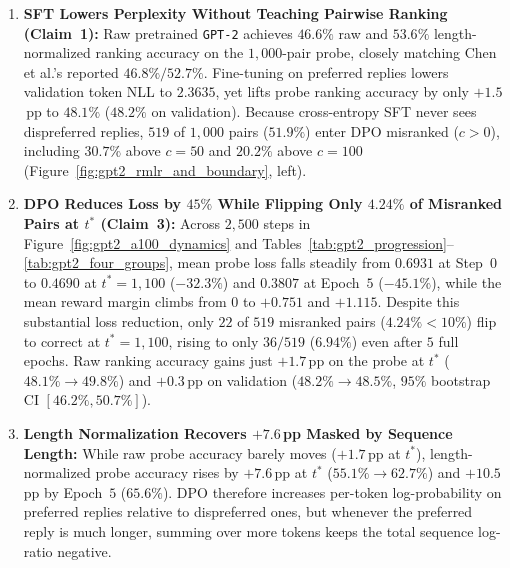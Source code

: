 \documentclass[11pt]{article}
\theoremstyle{plain}
\theoremstyle{definition}
\begin{document}
\begin{enumerate}[leftmargin=1.8em,itemsep=2.5pt,topsep=2pt]
  \item \textbf{SFT Lowers Perplexity Without Teaching Pairwise Ranking (Claim~1):} Raw pretrained \texttt{GPT-2} achieves $46.6\%$ raw and $53.6\%$ length-normalized ranking accuracy on the $1{,}000$-pair probe, closely matching Chen et al.'s reported $46.8\% / 52.7\%$. Fine-tuning on preferred replies lowers validation token NLL to $2.3635$, yet lifts probe ranking accuracy by only $+1.5$\,pp to $48.1\%$ ($48.2\%$ on validation). Because cross-entropy SFT never sees dispreferred replies, $519$ of $1{,}000$ pairs ($51.9\%$) enter DPO misranked ($c > 0$), including $30.7\%$ above $c = 50$ and $20.2\%$ above $c = 100$ (Figure~\ref{fig:gpt2_rmlr_and_boundary}, left).

  \item \textbf{DPO Reduces Loss by $45\%$ While Flipping Only $4.24\%$ of Misranked Pairs at $t^*$ (Claim~3):} Across $2{,}500$ steps in Figure~\ref{fig:gpt2_a100_dynamics} and Tables~\ref{tab:gpt2_progression}--\ref{tab:gpt2_four_groups}, mean probe loss falls steadily from $0.6931$ at Step~$0$ to $0.4690$ at $t^* = 1{,}100$ ($-32.3\%$) and $0.3807$ at Epoch~$5$ ($-45.1\%$), while the mean reward margin climbs from $0$ to $+0.751$ and $+1.115$. Despite this substantial loss reduction, only $22$ of $519$ misranked pairs ($4.24\% < 10\%$) flip to correct at $t^* = 1{,}100$, rising to only $36 / 519$ ($6.94\%$) even after $5$ full epochs. Raw ranking accuracy gains just $+1.7$\,pp on the probe at $t^*$ ($48.1\% \to 49.8\%$) and $+0.3$\,pp on validation ($48.2\% \to 48.5\%$, $95\%$ bootstrap CI $[46.2\%, 50.7\%]$).

  \item \textbf{Length Normalization Recovers $+7.6$\,pp Masked by Sequence Length:} While raw probe accuracy barely moves ($+1.7$\,pp at $t^*$), length-normalized probe accuracy rises by $+7.6$\,pp at $t^*$ ($55.1\% \to 62.7\%$) and $+10.5$\,pp by Epoch~$5$ ($65.6\%$). DPO therefore increases per-token log-probability on preferred replies relative to dispreferred ones, but whenever the preferred reply is much longer, summing over more tokens keeps the total sequence log-ratio negative.


\end{enumerate}
\end{document}
